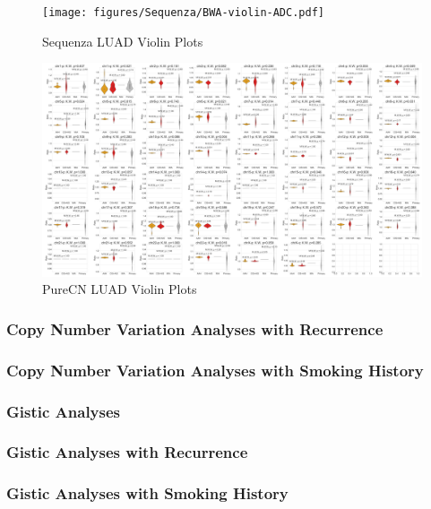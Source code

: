 \documentclass[11pt,a4paper,onecolumn,oneside]{report}
\begin{document}
                \begin{figure}[p]
                    \centering
                    \texttt{[image: figures/Sequenza/BWA-violin-ADC.pdf]}
                    \caption{Sequenza LUAD Violin Plots}
                    \label{fig:sequenza-ADC-violin}
                \end{figure}

                \begin{figure}[p]
                    \centering
                    \includegraphics[width=\linewidth]{figures/PureCN/BWA-violin-ADC.pdf}
                    \caption{PureCN LUAD Violin Plots}
                    \label{fig:PureCN-ADC-violin}
                \end{figure}

            \subsubsection{Copy Number Variation Analyses with Recurrence}

            \subsubsection{Copy Number Variation Analyses with Smoking History}

            \subsubsection{Gistic Analyses}

            \subsubsection{Gistic Analyses with Recurrence}

            \subsubsection{Gistic Analyses with Smoking History}
\end{document}
